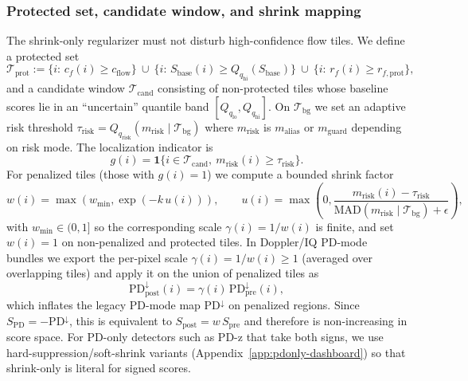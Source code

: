 \subsubsection{Protected set, candidate window, and shrink mapping}
The shrink-only regularizer must not disturb high-confidence flow tiles. We define a protected set
\[
\mathcal{T}_{\mathrm{prot}}:=\{i:\,c_f(i)\ge c_{\mathrm{flow}}\}\ \cup\ \{i:\,S_{\mathrm{base}}(i)\ge Q_{q_{\mathrm{hi}}}(S_{\mathrm{base}})\}\ \cup\ \{i:\,r_f(i)\ge r_{f,\mathrm{prot}}\},
\]
and a candidate window $\mathcal{T}_{\mathrm{cand}}$ consisting of non-protected tiles whose baseline scores lie in an ``uncertain'' quantile band $[Q_{q_{\mathrm{lo}}},Q_{q_{\mathrm{hi}}}]$. On $\mathcal{T}_{\mathrm{bg}}$ we set an adaptive risk threshold $\tau_{\mathrm{risk}}=Q_{q_{\mathrm{risk}}}(m_{\mathrm{risk}}\mid \mathcal{T}_{\mathrm{bg}})$ where $m_{\mathrm{risk}}$ is $m_{\mathrm{alias}}$ or $m_{\mathrm{guard}}$ depending on risk mode. The localization indicator is
\[
g(i)=\mathbf{1}\{i\in\mathcal{T}_{\mathrm{cand}},\ m_{\mathrm{risk}}(i)\ge\tau_{\mathrm{risk}}\}.
\]
For penalized tiles (those with $g(i)=1$) we compute a bounded shrink factor
\[
w(i)=\max\left(w_{\min},\exp\!\left(-k\,u(i)\right)\right),\qquad
u(i)=\max\!\left(0,\frac{m_{\mathrm{risk}}(i)-\tau_{\mathrm{risk}}}{\mathrm{MAD}(m_{\mathrm{risk}}\mid\mathcal{T}_{\mathrm{bg}})+\epsilon}\right),
\]
with $w_{\min}\in(0,1]$ so the corresponding scale $\gamma(i)=1/w(i)$ is finite, and set $w(i)=1$ on non-penalized and protected tiles. In Doppler/IQ PD-mode bundles we export the per-pixel scale $\gamma(i)=1/w(i)\ge 1$ (averaged over overlapping tiles) and apply it on the union of penalized tiles as
\[
\mathrm{PD}^{\downarrow}_{\mathrm{post}}(i)=\gamma(i)\,\mathrm{PD}^{\downarrow}_{\mathrm{pre}}(i),
\]
which inflates the legacy PD-mode map $\mathrm{PD}^{\downarrow}$ on penalized regions. Since $S_{\mathrm{PD}}=-\mathrm{PD}^{\downarrow}$, this is equivalent to $S_{\mathrm{post}}=w\,S_{\mathrm{pre}}$ and therefore is non-increasing in score space. For PD-only detectors such as PD-z that take both signs, we use hard-suppression/soft-shrink variants (Appendix~\ref{app:pdonly-dashboard}) so that shrink-only is literal for signed scores.

